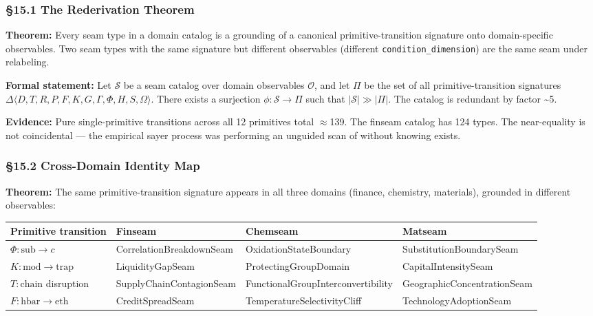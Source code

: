 \documentclass[12pt,a4paper]{article}
\newcommand{\pilcrow}{\S}
\begin{document}
\subsubsection{\pilcrow{}15.1 The Rederivation Theorem}

\textbf{Theorem:} Every seam type in a domain catalog is a grounding of a canonical primitive-transition signature onto domain-specific observables. Two seam types with the same signature but different observables (different \texttt{condition\_dimension}) are the same seam under relabeling.

\textbf{Formal statement:} Let $\mathcal{S}$ be a seam catalog over domain observables $\mathcal{O}$, and let $\Pi$ be the set of all primitive-transition signatures $\Delta\langle D,T,R,P,F,K,G,\Gamma,\Phi,H,S,\Omega\rangle$. There exists a surjection $\phi: \mathcal{S} \to \Pi$ such that $|\mathcal{S}| \gg |\Pi|$. The catalog is redundant by factor \textasciitilde{}5.

\textbf{Evidence:} Pure single-primitive transitions across all 12 primitives total $\approx$139. The finseam catalog has 124 types. The near-equality is not coincidental --- the empirical sayer process was performing an unguided scan of \Pi without knowing \Pi exists.

\subsubsection{\pilcrow{}15.2 Cross-Domain Identity Map}

\textbf{Theorem:} The same primitive-transition signature appears in all three domains (finance, chemistry, materials), grounded in different observables:

\begin{table}[htbp]
\centering
\small
{}
\begin{tabularx}{\textwidth}{>{\centering\arraybackslash}X >{\centering\arraybackslash}X >{\centering\arraybackslash}X >{\centering\arraybackslash}X}
\toprule
\rowcolor{gray!25}\textbf{Primitive transition} & \textbf{Finseam} & \textbf{Chemseam} & \textbf{Matseam} \\
\midrule
\rowcolors{1}{white}{gray!10}
$\Phi: \text{sub} \to c$ & CorrelationBreakdownSeam & OxidationStateBoundary & SubstitutionBoundarySeam \\
$K: \text{mod} \to \text{trap}$ & LiquidityGapSeam & ProtectingGroupDomain & CapitalIntensitySeam \\
$T: \text{chain}$ disruption & SupplyChainContagionSeam & FunctionalGroupInterconvertibility & GeographicConcentrationSeam \\
$F: \text{hbar} \to \text{eth}$ & CreditSpreadSeam & TemperatureSelectivityCliff & TechnologyAdoptionSeam \\
\bottomrule
\end{tabularx}
\end{table}
\end{document}
